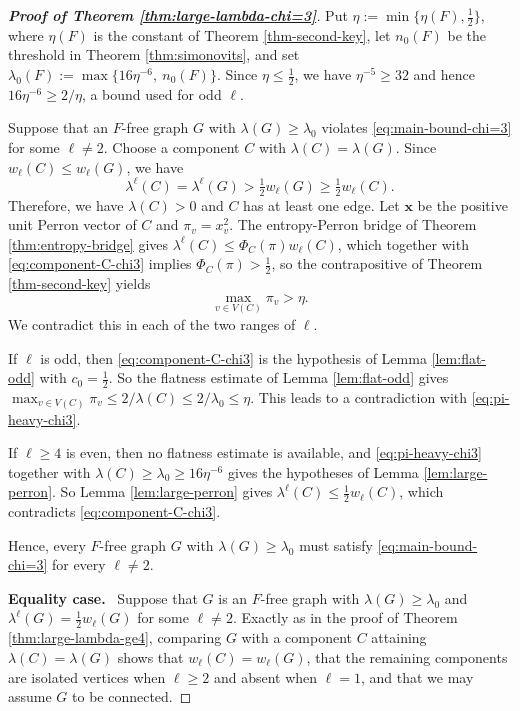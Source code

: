 \documentclass[11pt, a4paper]{article}
\theoremstyle{definition}
\theoremstyle{plain}
\renewcommand{\le}{\leqslant}
\renewcommand{\ge}{\geqslant}
\begin{document}
\begin{proof}[{\bf Proof of Theorem
\ref{thm:large-lambda-chi=3}}]
 Put
$\eta :=\min \{\eta (F),\frac12\}$, where $\eta (F)$ is
the constant of Theorem \ref{thm-second-key}, let $n_0(F)$
be the threshold in Theorem \ref{thm:simonovits}, and set
$\lambda_0(F):=\max \{16\eta^{-6},\ n_0(F)\}$. Since
$\eta \le \frac12$, we have $\eta^{-5}\ge 32$ and hence
$16\eta^{-6}\ge 2/\eta$, a bound used for odd $\ell$.

\smallskip
Suppose that an $F$-free graph $G$ with
$\lambda (G)\ge \lambda_0$ violates  
\eqref{eq:main-bound-chi=3} for some $\ell \neq 2$.
Choose a component $C$ with $\lambda (C)=\lambda (G)$.
Since $w_\ell (C)\le w_\ell (G)$, we have 
\begin{equation}\label{eq:component-C-chi3}
  \lambda^{\ell}(C)=\lambda^{\ell}(G)
  >\tfrac12 w_\ell (G) \ge \tfrac12 w_\ell (C).
\end{equation}
Therefore, we have $\lambda (C)>0$ and $C$ has at least one edge. Let
$\bm{x}$ be the positive unit Perron vector of $C$ and
$\pi_v=x_v^2$. The entropy-Perron bridge of Theorem \ref{thm:entropy-bridge} gives  
$\lambda^{\ell} (C) \le \Phi_C(\pi) w_{\ell}(C)$, which 
together
with \eqref{eq:component-C-chi3} implies 
$\Phi_C(\pi )>\frac12$, so the contrapositive of Theorem
\ref{thm-second-key} yields
\begin{equation}\label{eq:pi-heavy-chi3}
  \max_{v\in V(C)}\pi_v>\eta .
\end{equation}
We contradict this in each of the two ranges of $\ell$.

If $\ell$ is odd, then \eqref{eq:component-C-chi3} is the
hypothesis of Lemma \ref{lem:flat-odd} with
$c_0=\frac12$. So the flatness estimate of Lemma \ref{lem:flat-odd} gives
$\max_{v\in V(C)}\pi_v\le 2/\lambda (C)\le 2/\lambda_0
\le \eta$. This leads to a contradiction with \eqref{eq:pi-heavy-chi3}.

If $\ell \ge 4$ is even, then no flatness estimate is available, 
and \eqref{eq:pi-heavy-chi3} together with 
$\lambda (C)\ge \lambda_0\ge 16\eta^{-6}$ gives the
hypotheses of Lemma \ref{lem:large-perron}. 
So Lemma \ref{lem:large-perron} gives
$\lambda^{\ell}(C) \le \frac{1}{2} w_\ell (C)$, which  contradicts \eqref{eq:component-C-chi3}. 

Hence, every $F$-free graph $G$ with
$\lambda (G)\ge \lambda_0$ must satisfy 
\eqref{eq:main-bound-chi=3} for every $\ell \neq 2$.

\smallskip
\noindent
{\bf Equality case.}~
Suppose that $G$ is an $F$-free graph with
$\lambda (G)\ge \lambda_0$ and
$\lambda^\ell (G)=\frac12w_\ell (G)$ for some
$\ell \neq 2$. Exactly as in the proof of Theorem
\ref{thm:large-lambda-ge4}, comparing $G$ with a component
$C$ attaining $\lambda (C)=\lambda (G)$ shows that
$w_\ell (C)=w_\ell (G)$, that the remaining components are
isolated vertices when $\ell \ge 2$ and absent when
$\ell =1$, and that we may assume $G$ to be connected.


\end{proof}
\end{document}
